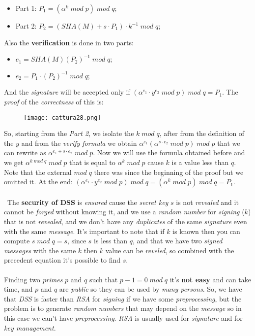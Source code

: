 \documentclass{article}
\begin{document}
\begin{itemize}
\item Part 1: $P_1= (\alpha^k\; mod\; p)\; mod\; q$;
\item Part 2: $P_2=(SHA(M)+ s \cdot P_1) \cdot k^{-1}\; mod\; q$;
\end{itemize}
Also the \textbf{verification} is done in two parts: 
\begin{itemize}
\item $e_1 = SHA(M) (P_2)^{-1} \; mod \; q$;
\item $e_2 = P_1 \cdot (P_2)^{-1} \; mod\; q$; 
\end{itemize}
And the \emph{signature} will be accepted only if $(\alpha^{e_1} \cdot y^{e_2} \; mod\; p) \; mod\; q = P_1$. The \emph{proof} of the \emph{correctness} of this is:
\begin{figure}[H]
  \centering
  \texttt{[image: cattura28.png]}
\end{figure}
So, starting from the \emph{Part 2}, we isolate the $k\; mod\; q$, after from the definition of the $y$ and from the \emph{verify formula} we obtain $\alpha^{e_1}(\alpha^{s\cdot e_2}\; mod\; p)\; mod\; p$ that we can rewrite as $\alpha^{e_1 + s \cdot e_2} \;mod \; p$. Now we will use the formula obtained before and we get $\alpha^{k\; mod\; q}\; mod\; p$ that is equal to $\alpha^{k}\; mod\; p$ cause $k$ is a value less than $q$. Note that the external $mod\; q$ there was since the beginning of the proof but we omitted it. At the end: $(\alpha^{e_1} \cdot y^{e_2}\; mod\; p)\; mod\; q = (\alpha^k \; mod\; p) \; mod\; q = P_1$.
\\\\\
The \textbf{security of DSS} is \emph{ensured} cause the \emph{secret key} $s$ is not \emph{revealed} and it cannot be \emph{forged} without knowing it, and we use a \emph{random number} for \emph{signing} ($k$) that is not \emph{revealed}, and we don't have any \emph{duplicates} of the same \emph{signature} even with the same \emph{message}. It's important to note that if $k$ is known then you can compute $s\; mod\; q = s$, since $s$ is less than $q$, and that we have two \emph{signed messages} with the same $k$ then $k$ value can be \emph{reveled}, so combined with the precedent equation it's possible to find $s$. \\\\
Finding two \emph{primes} $p$ and $q$ such that $p-1 = 0\; mod\; q$ it's \textbf{not easy} and can take time, and $p$ and $q$ are \emph{public} so they can be used by \emph{many persons}. So, we have that \emph{DSS} is faster than \emph{RSA} for \emph{signing} if we have some \emph{preprocessing}, but the problem is to generate \emph{random numbers} that may depend on the \emph{message} so in this case we can't have \emph{preprocessing}. \emph{RSA} is usually used for \emph{signature} and for \emph{key management}. \\\\
\end{document}
